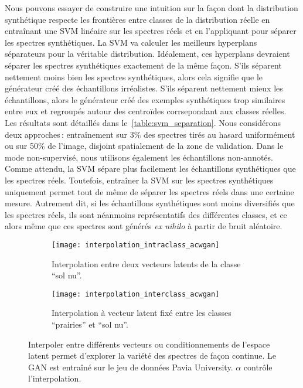 Nous pouvons essayer de construire une intuition sur la façon dont la distribution synthétique respecte les frontières entre classes de la distribution réelle en entraînant une \gls{SVM} linéaire sur les spectres réels et en l'appliquant pour séparer les spectres synthétiques. La \gls{SVM} va calculer les meilleurs hyperplans séparateurs pour la véritable distribution. Idéalement, ces hyperplans devraient séparer les spectres synthétiques exactement de la même façon. S'ils séparent nettement moins bien les spectres synthétiques, alors cela signifie que le générateur créé des échantillons irréalistes. S'ils séparent nettement mieux les échantillons, alors le générateur créé des exemples synthétiques trop similaires entre eux et regroupés autour des centroïdes corrsepondant aux classes réelles. Les résultats sont détaillés dans le~\cref{table:svm_separation}. Nous considérons deux approches\,: entraînement sur 3\% des spectres tirés au hasard uniformément ou sur 50\% de l'image, disjoint spatialement de la zone de validation. Dans le mode non-supervisé, nous utilisons également les échantillons non-annotés. Comme attendu, la \gls{SVM} sépare plus facilement les échantillons synthétiques que les spectres réels. Toutefois, entraîner la \gls{SVM} sur les spectres synthétiques uniquement permet tout de même de séparer les spectres réels dans une certaine mesure. Autrement dit, si les échantillons synthétiques sont moins diversifiés que les spectres réels, ils sont néanmoins représentatifs des différentes classes, et ce alors même que ces spectres sont générés \emph{ex nihilo} à partir de bruit aléatoire.

\begin{figure}[!t]
\begin{subfigure}{0.5\textwidth}
\texttt{[image: interpolation\_intraclass\_acwgan]}
\caption{Interpolation entre deux vecteurs latents de la classe ``sol nu''.}
\end{subfigure}%
\begin{subfigure}{0.5\textwidth}
\texttt{[image: interpolation\_interclass\_acwgan]}
\caption{Interpolation à vecteur latent fixé entre les classes ``prairies'' et ``sol nu''.}
\end{subfigure}
\caption{Interpoler entre différents vecteurs ou conditionnements de l'espace latent permet d'explorer la variété des spectres de façon continue. Le \gls{GAN} est entraîné sur le jeu de données Pavia University. $\alpha$ contrôle l'interpolation.}
\label{fig:interpolation}
\end{figure}

